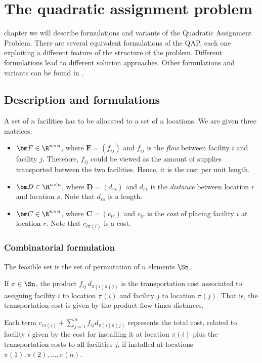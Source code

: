 \chapter{The quadratic assignment problem}
\label{Chap:TheQAP}

 chapter we will describe formulations and variants of the Quadratic Assignment Problem. There are several equivalent formulations of the QAP, each one exploiting a different feature of the structure of the problem. Different formulations lead to different solution approaches. Other formulations and variants can be found in \cite[Ch. 7]{Burkard2012}.



\section{Description and formulations}
\label{sec:formulations}
A set of $n$ facilities has to be allocated to a set of $n$ locations. We are given three matrices:
\begin{itemize}
	\item $\bm F\in\R^{n\times n}$, where $\bm F = (f_{ij})$ and $f_{ij}$ is the \textit{flow} between facility $i$ and facility $j$. Therefore, $f_{ij}$ could be viewed as the amount of supplies transported between the two facilities. Hence, it is the cost per unit length.
	\item $\bm D\in\R^{n\times n}$, where $\bm D  = (d_{rs})$ and $d_{rs}$ is the \textit{distance} between location $r$ and location $s$.  Note that $d_{rs}$ is a length.
	\item $\bm C\in\R^{n\times n}$, where $\bm C= (c_{ir})$ and $c_{ir}$ is the \textit{cost} of placing facility $i$ at location $r$. Note that $c_{i\pi(i)}$ is a cost.
\end{itemize}

\subsection{Combinatorial formulation}
The feasible set is the set of permutation of $n$ elements $\Sn$. 

If $\pi \in \Sn$, the product $f_{ij}\, d_{\pi(i)\pi(j)}$ is the transportation cost associated to assigning facility $i$ to location $\pi(i)$ and facility $j$ to location $\pi(j)$. That is, the transportation cost is given by the product flow times distances. 

Each term $c_{i \pi(i)}+\sum_{j=1}^n f_{ij}d_{\pi(i)\pi(j)}$ represents the total cost, related to facility $i$ given by the cost for installing it at location $\pi(i)$ plus the transportation costs to all facilities $j$, if installed at locations $\pi(1),\pi(2),\dots,\pi(n)$. 

